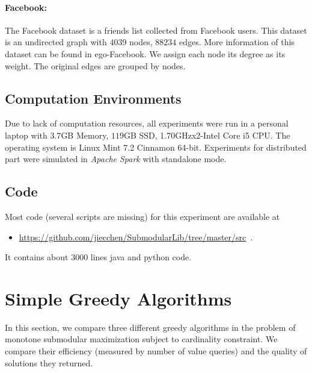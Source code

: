 \documentclass[11pt]{article}
\begin{document}
\paragraph{Facebook:} 
The {\sc Facebook} dataset is a friends list collected from Facebook users. This dataset is an undirected graph with $4039$ nodes, $88234$ edges. More information of this dataset can be found in \cite{snapnets} ego-Facebook.  We assign each node its degree as its weight. The original edges are grouped by nodes.

\subsection{Computation Environments}
Due to lack of computation resources, all experiments were run in a personal laptop with $3.7$GB Memory, $119$GB SSD, 1.70GHzx2-Intel Core i5 CPU. The operating system is Linux Mint 7.2 Cinnamon 64-bit. Experiments for distributed part were simulated in \emph{Apache Spark} with standalone mode. 

\subsection{Code} 
Most code (several scripts are missing) for this experiment are available at 
\begin{itemize}
\item \url{https://github.com/jiecchen/SubmodularLib/tree/master/src}~.
\end{itemize}
It contains about $3000$ lines java and python code.

\section{Simple Greedy Algorithms}
\label{sec:greedy}
In this section, we compare three different greedy algorithms in the problem of monotone submodular maximization subject to cardinality constraint. We compare their efficiency (measured by number of value queries) and the quality of solutions they returned.
\end{document}
